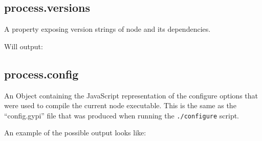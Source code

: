 \subsection{process.versions}

A property exposing version strings of node and its dependencies.

\begin{Shaded}
\begin{Highlighting}[]
\NormalTok{(}\NormalTok{);}
\end{Highlighting}
\end{Shaded}

Will output:

\begin{Shaded}
\begin{Highlighting}[]
\NormalTok{\{ }\NormalTok{: }\NormalTok{,}
  \NormalTok{: }\NormalTok{,}
  \NormalTok{: }\NormalTok{,}
  \NormalTok{: }\NormalTok{,}
  \NormalTok{: } \NormalTok{\}}
\end{Highlighting}
\end{Shaded}

\subsection{process.config}

An Object containing the JavaScript representation of the configure
options that were used to compile the current node executable. This is
the same as the ``config.gypi'' file that was produced when running the
\texttt{./configure} script.

An example of the possible output looks like:

